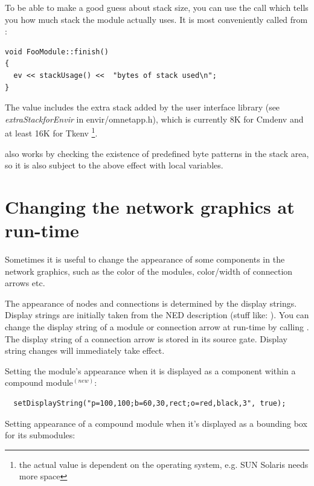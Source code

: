 To be able to make a good guess about stack size, you can use 
the  call which tells you how much stack the module 
actually uses. It is most conveniently called from :

\begin{Verbatim}
void FooModule::finish()
{
  ev << stackUsage() <<  "bytes of stack used\n";
}
\end{Verbatim}


The value includes the extra stack added by the user interface library
(see \textit{extraStackforEnvir} in
envir/omnetapp.h), which is currently 8K for Cmdenv and at least 16K
for Tkenv \footnote{the actual value is dependent on the operating
  system, e.g.  SUN Solaris needs more space}.

also works by checking the existence of predefined
byte patterns in the stack area, so it is also subject to the above
effect with local variables.


\section{Changing the network graphics at run-time}

Sometimes it is useful to change the appearance of some components in
the network graphics, such as the color of the
modules, color/width of connection arrows etc.

\begin{sloppypar}
  The appearance of nodes and connections is determined by the display
  strings. Display strings are initially taken
  from the NED description (stuff like: ). You can change the display string of a module
  or connection arrow at run-time by calling
  .  The display string of a connection
  arrow is stored in its source gate.
  Display string changes will immediately take effect.
\end{sloppypar}

Setting the module's appearance when it is displayed as a component 
within a compound module$^{(new)}$:

\begin{Verbatim}
  setDisplayString("p=100,100;b=60,30,rect;o=red,black,3", true);
\end{Verbatim}

Setting appearance of a compound module when it's displayed as a
bounding box for its submodules:

